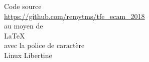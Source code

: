Code source\\
\url{https://github.com/remytms/tfe\_ecam\_2018}\\
au moyen de\\
\LaTeX\\
avec la police de caractère\\
Linux Libertine
